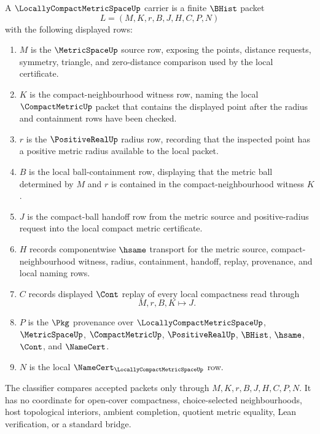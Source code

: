 \begin{definition}
\label{def:locally-compact-metric-space-carrier}
A $\LocallyCompactMetricSpaceUp$ carrier is a finite $\BHist$ packet
$$
L=(M,K,r,B,J,H,C,P,N)
$$
with the following displayed rows:
\begin{enumerate}
\item $M$ is the $\MetricSpaceUp$ source row, exposing the points, distance requests, symmetry, triangle, and zero-distance comparison used by the local certificate.
\item $K$ is the compact-neighbourhood witness row, naming the local $\CompactMetricUp$ packet that contains the displayed point after the radius and containment rows have been checked.
\item $r$ is the $\PositiveRealUp$ radius row, recording that the inspected point has a positive metric radius available to the local packet.
\item $B$ is the local ball-containment row, displaying that the metric ball determined by $M$ and $r$ is contained in the compact-neighbourhood witness $K$.
\item $J$ is the compact-ball handoff row from the metric source and positive-radius request into the local compact metric certificate.
\item $H$ records componentwise $\hsame$ transport for the metric source, compact-neighbourhood witness, radius, containment, handoff, replay, provenance, and local naming rows.
\item $C$ records displayed $\Cont$ replay of every local compactness read through
$$
M,r,B,K \longmapsto J .
$$
\item $P$ is the $\Pkg$ provenance over $\LocallyCompactMetricSpaceUp$, $\MetricSpaceUp$, $\CompactMetricUp$, $\PositiveRealUp$, $\BHist$, $\hsame$, $\Cont$, and $\NameCert$.
\item $N$ is the local $\NameCert_{\LocallyCompactMetricSpaceUp}$ row.
\end{enumerate}
The classifier compares accepted packets only through $M,K,r,B,J,H,C,P,N$. It has no coordinate for open-cover compactness, choice-selected neighbourhoods, host topological interiors, ambient completion, quotient metric equality, Lean verification, or a standard bridge.
\end{definition}

